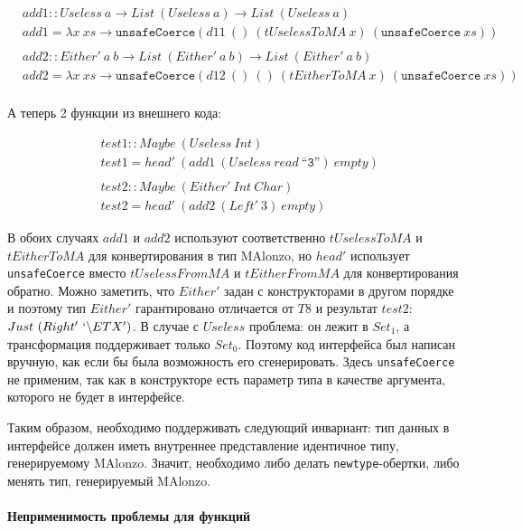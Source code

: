 \begin{align*}
\\
&add1 :: Useless\ a \rightarrow List\ (Useless\ a) \rightarrow List\ (Useless\ a)\\
&add1 = \lambda x\ xs \rightarrow \texttt{unsafeCoerce} (d11\ () \ (
   tUselessToMA\ x)\ (\texttt{unsafeCoerce}\ xs))\\
\\
&add2 :: Either'\ a\ b \rightarrow List\ (Either'\ a\ b) \rightarrow
   List\ (Either'\ a\ b)\\
&add2 = \lambda x\ xs \rightarrow \texttt{unsafeCoerce} (d12\ ()\ () \ (
   tEitherToMA\ x)\ (\texttt{unsafeCoerce}\ xs))\\
\end{align*}

А теперь 2 функции из внешнего кода:

\begin{align*}
&test1 :: Maybe\ (Useless\ Int)\\
&test1 = head'\ (add1\ (Useless\ read\ \texttt{``3''})\ empty)\\
\\
&test2 :: Maybe\ (Either'\ Int\ Char)\\
&test2 = head'\ (add2\ (Left'\ 3)\ empty)
\end{align*}

В обоих случаях \(add1\) и \(add2\) используют соответственно \(tUselessToMA\) и
\(tEitherToMA\) для конвертирования в тип MAlonzo, но \(head'\) использует
\texttt{unsafeCoerce} вместо \(tUselessFromMA\) и \(tEitherFromMA\) для
конвертирования обратно. Можно заметить, что \(Either'\) задан с конструкторами
в другом порядке и поэтому тип \(Either'\) гарантировано отличается от \(T8\)
и результат \(test2\): \(Just\ (Right'\ `\backslash ETX')\). В случае с
\(Useless\) проблема: он лежит в \(Set_1\), а трансформация поддерживает только
\(Set_0\). Поэтому код интерфейса был написан вручную, как если бы была возможность
его сгенерировать. Здесь \texttt{unsafeCoerce} не применим, так как в конструкторе
есть параметр типа в качестве аргумента, которого не будет в интерфейсе.

Таким образом, необходимо поддерживать следующий инвариант: тип данных в интерфейсе
должен иметь внутреннее представление идентичное типу, генерируемому MAlonzo. Значит,
необходимо либо делать \texttt{newtype}-обертки, либо менять тип, генерируемый
MAlonzo.

\paragraph{Неприменимость проблемы для функций}

